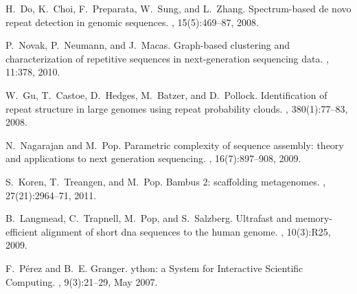 \documentclass{pnastwo}
\begin{document}
\begin{article}
\begin{thebibliography}{20}
H.~Do, K.~Choi, F.~Preparata, W.~Sung, and L.~Zhang.
\newblock Spectrum-based de novo repeat detection in genomic sequences.
, 15(5):469--87, 2008.

P.~Novak, P.~Neumann, and J.~Macas.
\newblock Graph-based clustering and characterization of repetitive sequences
  in next-generation sequencing data.
, 11:378, 2010.

W.~Gu, T.~Castoe, D.~Hedges, M.~Batzer, and D.~Pollock.
\newblock Identification of repeat structure in large genomes using repeat
  probability clouds.
, 380(1):77--83, 2008.

N.~Nagarajan and M.~Pop.
\newblock Parametric complexity of sequence assembly: theory and applications
  to next generation sequencing.
, 16(7):897--908, 2009.

S.~Koren, T.~Treangen, and M.~Pop.
\newblock Bambus 2: scaffolding metagenomes.
, 27(21):2964--71, 2011.

B.~Langmead, C.~Trapnell, M.~Pop, and S.~Salzberg.
\newblock Ultrafast and memory-efficient alignment of short dna sequences to
  the human genome.
, 10(3):R25, 2009.

F.~P\'erez and B.~E. Granger.
ython: a {S}ystem for {I}nteractive {S}cientific {C}omputing.
, 9(3):21--29, May 2007.




\end{thebibliography}

\end{article}
\end{document}
